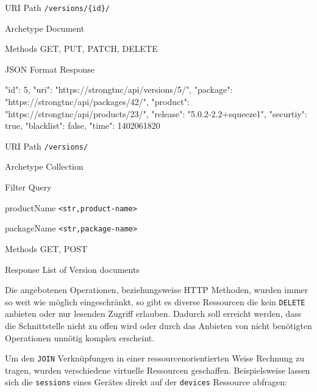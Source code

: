 \begin{mdframed}[style=def]
\begin{description*}
	\item[URI Path] \texttt{/versions/\{id\}/}
	\item[Archetype] Document
	\item[Methods] GET, PUT, PATCH, DELETE
	\item[JSON Format Response] \hfill
\begin{jsoncode}
{
	"id": 5,
	"uri": "https://strongtnc/api/versions/5/",
	"package": "https://strongtnc/api/packages/42/",
	"product": "https://strongtnc/api/products/23/",
	"release": "5.0.2-2.2+squeeze1",
	"securtiy": true,
	"blacklist": false,
	"time": 1402061820
}
\end{jsoncode}
\end{description*}
\end{mdframed}

\begin{mdframed}[style=def]
\begin{description*}
	\item[URI Path] \texttt{/versions/}
	\item[Archetype] Collection
	\item[Filter Query] \hfill
	\begin{description*}
		\item[productName] \texttt{<str,product-name>}
		\item[packageName] \texttt{<str,package-name>}
	\end{description*}
	\item[Methods] GET, POST
	\item[Response] List of Version documents
\end{description*}
\end{mdframed}

Die angebotenen Operationen, beziehungsweise HTTP Methoden, wurden immer so weit
wie möglich eingeschränkt, so gibt es diverse Ressourcen die kein
\texttt{DELETE} anbieten oder nur lesenden Zugriff erlauben. Dadurch soll
erreicht werden, dass die Schnittstelle nicht zu offen wird oder durch das
Anbieten von nicht benötigten Operationen unnötig komplex erscheint.

Um den \texttt{JOIN} Verknüpfungen in einer ressourcenorientierten Weise
Rechnung zu tragen, wurden verschiedene virtuelle Ressourcen geschaffen.
Beispielsweise lassen sich die \texttt{sessions} eines Gerätes direkt auf der
\texttt{devices} Ressource abfragen:

